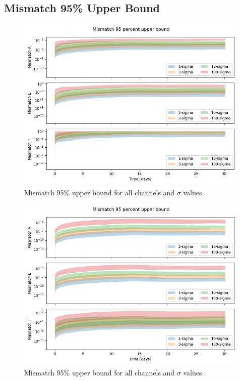 \documentclass[a4paper,12pt]{article}
\begin{document}
\subsection{Mismatch 95\% Upper Bound}
\begin{figure}[h!]
    \centering
    \includegraphics[width=\textwidth]{results/mismatch_upper95_tdi_deviation_A1.084702251e-22_f0.0001_fdot1.47197271e-17.png}
    \caption{Mismatch 95\% upper bound for all channels and $\sigma$ values.}
    \label{fig:mismatch_upper95_1e-4}
\end{figure}

\begin{figure}
    \centering
    \includegraphics[width=\textwidth]{results/mismatch_upper95_tdi_deviation_A1.084702251e-22_f0.001_fdot1.47197271e-17.png}
    \caption{Mismatch 95\% upper bound for all channels and $\sigma$ values.}
    \label{fig:mismatch_upper95_1e-3}
\end{figure}
\end{document}
